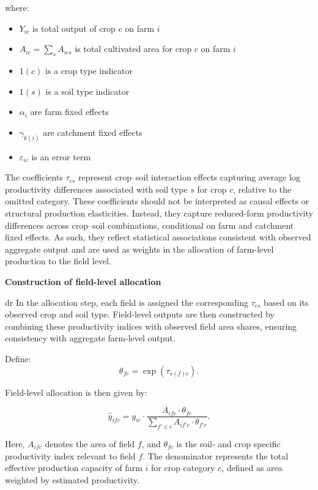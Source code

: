 \documentclass{article}
\begin{document}
where:
\begin{itemize}
    \item $Y_{ic}$ is total output of crop $c$ on farm $i$
    \item $A_{ic} = \sum_s A_{ics}$ is total cultivated area for crop $c$ on farm $i$
    \item $1(c)$ is a crop type indicator
    \item $1(s)$ is a soil type indicator
    \item $\alpha_i$ are farm fixed effects
    \item $\gamma_{k(i)}$ are catchment fixed effects
    \item $\varepsilon_{ic}$ is an error term
\end{itemize}

The coefficients $\tau_{cs}$ represent crop–soil interaction effects capturing average log productivity differences associated with soil type $s$ for crop $c$, relative to the omitted category. These coefficients should not be interpreted as causal effects or structural production elasticities. Instead, they capture reduced-form productivity differences across crop–soil combinations, conditional on farm and catchment fixed effects. As such, they reflect statistical associations consistent with observed aggregate output and are used as weights in the allocation of farm-level production to the field level.

\textbf{Construction of field-level allocation }


dr In the allocation step, each field is assigned the corresponding $\tau_{cs}$ based on its observed crop and soil type. Field-level outputs are then constructed by combining these productivity indices with observed field area shares, ensuring consistency with aggregate farm-level output. 


Define:
\[
\theta_{fc} = \exp(\tau_{s(f)c}).
\]

Field-level allocation is then given by:

\[
\hat{y}_{ifc}
=
y_{ic}
\cdot
\frac{
A_{ifc} \cdot \theta_{fc}
}{
\sum_{f' \in i}
A_{if'c} \cdot \theta_{f'c}
}.
\]

Here, $A_{ifc}$ denotes the area of field $f$, and $\theta_{fc}$ is the soil- and crop specific productivity index relevant to field $f$. The denominator represents the total effective production capacity of farm $i$ for crop category $c$, defined as area weighted by estimated productivity.

\vspace{0.5cm}
\end{document}
